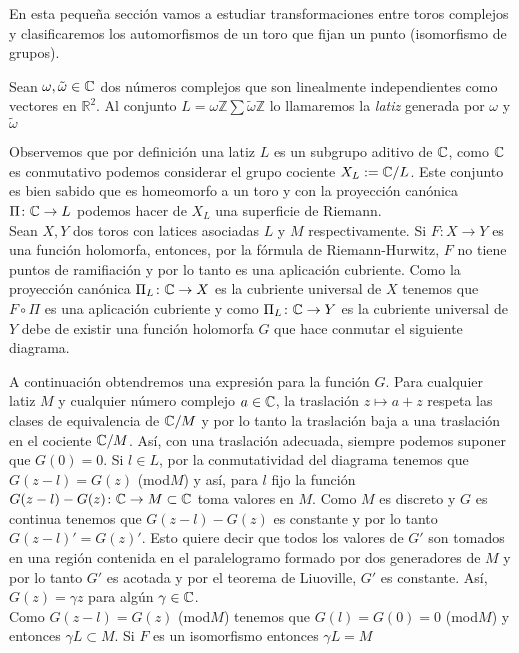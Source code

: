 En esta pequeña sección vamos a estudiar transformaciones entre toros complejos y clasificaremos los automorfismos de un toro que fijan un punto (isomorfismo de grupos).

\begin{defn}
\label{latiz}
Sean $\omega,\tilde{\omega}\in\mathbb{C}$ dos números complejos que son linealmente independientes como vectores en $\mathbb{R}^{2}$. Al conjunto $L=\omega\mathbb{Z}\sum\tilde{\omega}\mathbb{Z}$ lo llamaremos la \emph{latiz} generada por $\omega$ y $\tilde{\omega}$
\end{defn}

Observemos que por definición una latiz $L$ es un subgrupo aditivo de $\mathbb{C}$, como $\mathbb{C}$ es conmutativo podemos considerar el grupo cociente $X_{L}:=\mathbb{C}/L$. Este conjunto es bien sabido que es homeomorfo a un toro y con la proyección canónica $\Pi\colon\mathbb{C}\rightarrow L$ podemos hacer de $X_{L}$ una superficie de Riemann.\\

Sean $X,Y$ dos toros con latices asociadas $L$ y $M$ respectivamente. Si $F\colon X\rightarrow Y$ es una función holomorfa, entonces, por la fórmula de Riemann-Hurwitz, $F$ no tiene puntos de ramifiación y por lo tanto es una aplicación cubriente. Como la proyección canónica $\Pi_{L}\colon\mathbb{C}\rightarrow X$ es la  cubriente universal de $X$ tenemos que $F\circ\Pi$ es una aplicación cubriente y como $\Pi_{L}\colon\mathbb{C}\rightarrow Y$ es la cubriente universal de $Y$ debe de existir una función holomorfa $G$ que hace conmutar el siguiente diagrama.


A continuación obtendremos una expresión para la función $G$. Para cualquier latiz $M$ y cualquier número complejo $a\in\mathbb{C}$, la traslación $z\mapsto a+z$ respeta las clases de equivalencia de $\mathbb{C}/M$ y por lo tanto la traslación baja a una traslación en el cociente $\mathbb{C}/M$. Así, con una traslación adecuada, siempre podemos suponer que $G(0)=0$. Si $l\in L$, por la conmutatividad del diagrama tenemos que $G(z-l)=G(z)$ (mod$M$) y así, para $l$ fijo la función $G(z-l)-G(z)\colon\mathbb{C}\rightarrow M\subset\mathbb{C}$ toma valores en $M$. Como $M$ es discreto y $G$ es continua tenemos que $G(z-l)-G(z)$ es constante y por lo tanto $G(z-l)'=G(z)'$. Esto quiere decir que todos los valores de $G'$ son tomados en una región contenida en el paralelogramo formado por dos generadores de $M$ y por lo tanto $G'$ es acotada y por el teorema de Liuoville, $G'$ es constante. Así, $G(z)=\gamma z$ para algún $\gamma\in\mathbb{C}$.\\

Como $G(z-l)=G(z)$ (mod$M$) tenemos que $G(l)=G(0)=0$ (mod$M$) y entonces $\gamma L\subset M$. Si $F$ es un isomorfismo entonces $\gamma L=M$
